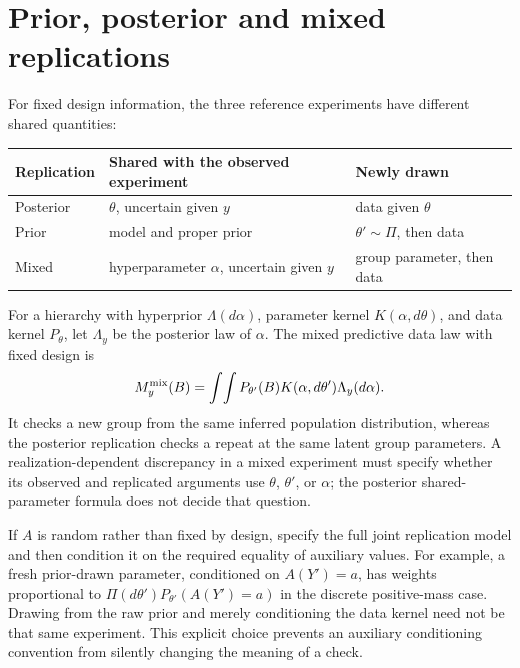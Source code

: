 \section{Prior, posterior and mixed replications}
\label{sec:p15-ppc-replication-choices}

For fixed design information, the three reference experiments have different
shared quantities:
\begin{center}\small
\begin{tabular}{p{.15\linewidth}p{.40\linewidth}p{.30\linewidth}}
\hline
Replication & Shared with the observed experiment & Newly drawn\\\hline
Posterior & \(\theta\), uncertain given \(y\)&data given \(\theta\)\\
Prior & model and proper prior&\(\theta'\sim\Pi\), then data\\
Mixed & hyperparameter \(\alpha\), uncertain given \(y\)&group parameter, then data\\\hline
\end{tabular}
\end{center}
For a hierarchy with hyperprior \(\Lambda(d\alpha)\), parameter kernel
\(K(\alpha,d\theta)\), and data kernel \(P_\theta\), let
\(\Lambda_y\) be the posterior law of \(\alpha\). The mixed
predictive data law with fixed design is
\[
 M^{\rm mix}_y(B)=\int\!\int P_{\theta'}(B)
                 K(\alpha,d\theta')\Lambda_y(d\alpha).
\]
It checks a new group from the same inferred population distribution,
whereas the posterior replication checks a repeat at the same latent group
parameters. A realization-dependent discrepancy in a mixed experiment must
specify whether its observed and replicated arguments use \(\theta\),
\(\theta'\), or \(\alpha\); the posterior shared-parameter formula
does not decide that question.

If \(A\) is random rather than fixed by design, specify the full joint
replication model and then condition it on the required equality of auxiliary
values. For example, a fresh prior-drawn parameter, conditioned on
\(A(Y')=a\), has weights proportional to
\(\Pi(d\theta')P_{\theta'}(A(Y')=a)\) in the discrete positive-mass
case. Drawing from the raw prior and merely conditioning the data kernel
need not be that same experiment. This explicit choice prevents an auxiliary
conditioning convention from silently changing the meaning of a check.

